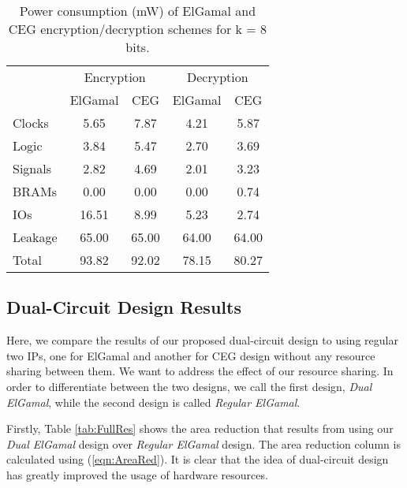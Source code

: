 \documentclass[conference]{IEEEtran}
\begin{document}
\begin{table}[t]
  \centering
  \caption{Power consumption (mW) of ElGamal and CEG encryption/decryption schemes for k = 8 bits.}
    \tabcolsep=0.11cm 
\begin{tabular}{|l||c|c||c|c|}
    \toprule
                  & \multicolumn{2}{c}{Encryption } & \multicolumn{2}{c}{Decryption} \vline\\
                  & ElGamal & CEG     & ElGamal & CEG \\
    \midrule
    Clocks  & 5.65 & 7.87 & 4.21 & 5.87 \\
    Logic   & 3.84 & 5.47 & 2.70 & 3.69 \\
    Signals & 2.82 & 4.69 & 2.01 & 3.23 \\
    BRAMs   & 0.00 & 0.00 & 0.00 & 0.74 \\
    IOs     & 16.51 & 8.99 & 5.23 & 2.74 \\
    Leakage & 65.00 & 65.00 & 64.00 & 64.00 \\
    \midrule
    Total   & 93.82 & 92.02 & 78.15 & 80.27 \\
    \bottomrule 
    \end{tabular}\label{tab:PartialPower}\end{table}
\subsection{Dual-Circuit Design Results}

Here, we compare the results of our proposed dual-circuit design to using regular two IPs, one for ElGamal and another for CEG design without any resource sharing between them. We want to address the effect of our resource sharing. In order to differentiate between the two designs, we call the first design, \textit{Dual ElGamal}, while the second design is called \textit{Regular ElGamal}.    

Firstly, Table \ref{tab:FullRes} shows the area reduction that results from using our \textit{Dual ElGamal} design over \textit{Regular ElGamal} design. The area reduction column is calculated using (\ref{eqn:AreaRed}). It is clear that the idea of dual-circuit design has greatly improved the usage of hardware resources.
\end{document}
